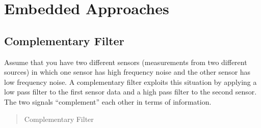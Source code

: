 \hypertarget{embedded-approaches}{%
\section{Embedded Approaches}\label{embedded-approaches}}

\hypertarget{complementary-filter}{%
\subsection{Complementary Filter}\label{complementary-filter}}

Assume that you have two different sensors (measurements from two
different sources) in which one sensor has high frequency noise and the
other sensor has low frequency noise. A complementary filter exploits
this situation by applying a low pass filter to the first sensor data
and a high pass filter to the second sensor. The two signals
``complement'' each other in terms of information.

\begin{quote}
Complementary Filter
\end{quote}
